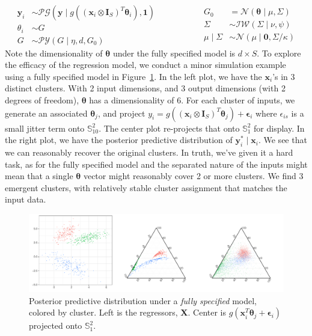     \begin{equation}
        \label{eqn:regressionmodel}
        \begin{aligned}
            \bm{y}_i &\sim \mathcal{PG}\left(\bm{y}\mid g\left((\bm{x}_i\otimes\bm{I}_S)^T\bm{\theta}_i\right), \bm{1}\right)\\
            \theta_i &\sim G\\
            G &\sim \mathcal{PY}(G\mid\eta, d, G_0)
        \end{aligned}
        ~\hspace{2cm}
        \begin{aligned}
            G_0 &= \mathcal{N}(\bm{\theta} \mid \mu, \Sigma)\\
            \Sigma &\sim \mathcal{IW}(\Sigma\mid \nu, \psi)\\
            \mu\mid\Sigma &\sim \mathcal{N}(\mu\mid \bm{0}, \Sigma / \kappa)
        \end{aligned}
    \end{equation}
    Note the dimensionality of $\bm{\theta}$ under the fully specified model is $d\times S$.
    To explore the efficacy of the regression model, we conduct a minor simulation example using a 
    fully specified model in Figure~\ref{fig:simreg}.  In the left plot, we have the $\bm{x}_i$'s in
    3 distinct clusters. With 2 input dimensions, and 3 output dimensions 
    (with 2 degrees of freedom), $\bm{\theta}$ has a dimensionality of 6. For each cluster
    of inputs, we generate an associated $\bm{\theta}_j$, and project 
    $y_i = g\left((\bm{x}_i\otimes\bm{I}_S)^T\bm{\theta}_j\right) + \bm{\epsilon}_i$ where 
    $\epsilon_{is}$ is a small jitter term onto 
    $\mathbb{S}_{10}^{2}$.  The center plot re-projects that onto $\mathbb{S}_1^{2}$ for display.
    In the right plot, we have the posterior predictive distribution of $\bm{y}_i^{*}\mid \bm{x}_i$.
    We see that we can reasonably recover the original clusters.  In truth, we've given it a hard
    task, as for the fully specified model and the separated nature of the inputs might mean that 
    a single $\bm{\theta}$ vector might reasonably cover 2 or more clusters.  We find 3 emergent
    clusters, with relatively stable cluster assignment that matches the input data.

\begin{figure}[t]
    \centering
    \caption{Posterior predictive distribution under a \emph{fully specified} model, colored 
        by cluster.  Left is the regressors, $\bm{X}$.  Center is 
        $g(\bm{x}_i^T\bm{\theta}_j + \bm{\epsilon}_i)$ projected onto $\mathbb{S}_1^2$.
        \label{fig:simreg}}
    \includegraphics[width = \textwidth]{plots/simulated_reg}
\end{figure}

